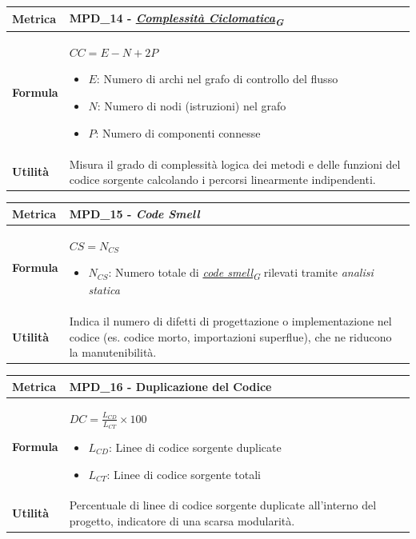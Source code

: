 \documentclass[12pt, a4paper]{article}
\newcommand{\urlglossario}{https://skynetunigroup.github.io/Code_Guardian/Documentazione/PB/glossario_v2.0.0.pdf} %
\newcommand{\glo}[2]{\href{\urlglossario\#nameddest=#2}{#1\textsubscript{G}}}
\begin{document}
\begin{table}[H]
\centering
\renewcommand{\arraystretch}{1.5}
\begin{tabular}{|l|p{12cm}|}
\hline
\textbf{Metrica} & MPD\_14 - \textit{\glo{Complessità Ciclomatica}{complessità-ciclomatica}} \\ \hline
\textbf{Formula} & $CC = E - N + 2P$
\begin{itemize}
    \item $E$: Numero di archi nel grafo di controllo del flusso
    \item $N$: Numero di nodi (istruzioni) nel grafo
    \item $P$: Numero di componenti connesse
\end{itemize} \\ \hline
\textbf{Utilità} & Misura il grado di complessità logica dei metodi e delle funzioni del codice sorgente calcolando i percorsi linearmente indipendenti. \\ \hline
\end{tabular}
\end{table}

\begin{table}[H]
\centering
\renewcommand{\arraystretch}{1.5}
\begin{tabular}{|l|p{12cm}|}
\hline
\textbf{Metrica} & MPD\_15 - \textit{Code Smell} \\ \hline
\textbf{Formula} & $CS = N_{CS}$
\begin{itemize}
    \item $N_{CS}$: Numero totale di \textit{\glo{code smell}{code-smell}} rilevati tramite \textit{analisi statica}
\end{itemize} \\ \hline
\textbf{Utilità} & Indica il numero di difetti di progettazione o implementazione nel codice (es. codice morto, importazioni superflue), che ne riducono la manutenibilità. \\ \hline
\end{tabular}
\end{table}

\begin{table}[H]
\centering
\renewcommand{\arraystretch}{1.5}
\begin{tabular}{|l|p{12cm}|}
\hline
\textbf{Metrica} & MPD\_16 - Duplicazione del Codice \\ \hline
\textbf{Formula} & $DC = \frac{L_{CD}}{L_{CT}} \times 100$
\begin{itemize}
    \item $L_{CD}$: Linee di codice sorgente duplicate
    \item $L_{CT}$: Linee di codice sorgente totali
\end{itemize} \\ \hline
\textbf{Utilità} & Percentuale di linee di codice sorgente duplicate all'interno del progetto, indicatore di una scarsa modularità. \\ \hline
\end{tabular}
\end{table}
\end{document}
